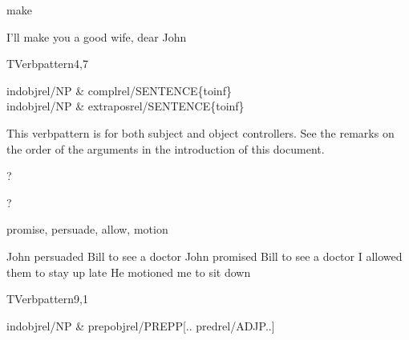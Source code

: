 
\begin{thetadescr}
\evitem make
\esitem
     \begin{examples}
        \example I'll make you a good wife, dear John
     \end{examples}
\end{thetadescr}


\newpage
{}
\begin{vpattern}
 TVerbpattern4,7
\csritem \mbox{}\\
     \begin{csr}
      indobjrel/NP & complrel/SENTENCE\{toinf\}\\
      indobjrel/NP & extraposrel/SENTENCE\{toinf\}
     \end{csr}
\remarksitem This verbpattern is for both subject and object controllers. See 
the remarks on the order of the arguments in the introduction of this document.
\end{vpattern}


\begin{thetadescr}
\evitem ?
\esitem
     \begin{examples}
        \example ?
     \end{examples}
\end{thetadescr}



\begin{thetadescr}
\evitem promise, persuade, allow, 
motion
\esitem
     \begin{examples}
        \example John persuaded Bill to see a doctor
        \example John promised Bill to see a doctor
        \example I allowed them to stay up late
        \example He motioned me to sit down
     \end{examples}
\end{thetadescr}


\newpage
{}
\begin{vpattern}
 TVerbpattern9,1
\csritem \mbox{}\\
     \begin{csr}
      indobjrel/NP & prepobjrel/PREPP[.. predrel/ADJP..]
     \end{csr}
\remarksitem
\end{vpattern}

